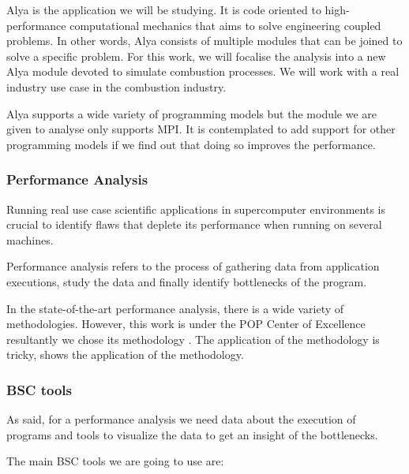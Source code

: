 \justify
Alya \cite{alya} is the application we will be studying.  It is code oriented to high-performance computational mechanics that aims to solve engineering coupled problems. In other words, Alya consists of multiple modules that can be joined to solve a specific problem. For this work, we will focalise the analysis into a new Alya module devoted to simulate combustion processes. We will work with a real industry use case in the combustion industry.

\justify
Alya supports a wide variety of programming models but the module we are given to analyse only supports MPI. It is contemplated to add support for other programming models if we find out that doing so improves the performance.

\subsubsection{Performance Analysis}

\justify
Running real use case scientific applications in supercomputer environments is crucial to identify flaws that deplete its performance when running on several machines.

\justify
Performance analysis refers to the process of gathering data from application executions, study the data and finally identify bottlenecks of the program.

\justify
In the state-of-the-art performance analysis, there is a wide variety of methodologies. However, this work is under the POP Center of Excellence resultantly we chose its methodology  \cite{popMethod}. The application of the methodology is tricky,  \cite{paperparaver} shows the application of the methodology.

\subsubsection{BSC tools}
\justify
As said, for a performance analysis we need data about the execution of programs and tools to visualize the data to get an insight of the bottlenecks.

\justify
The main BSC tools we are going to use are:


